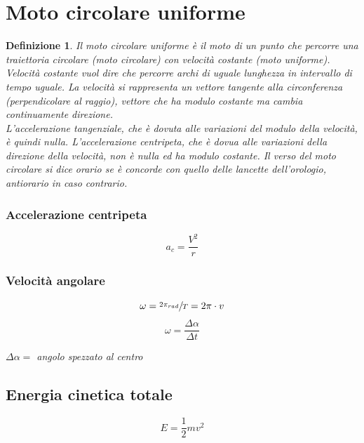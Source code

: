 \documentclass{book}
\newtheorem{defi}{Definizione}[section]
\begin{document}
\section{Moto circolare uniforme}
\label{sec:motCircUni}
\begin{defi}
  Il moto circolare uniforme è il moto di un punto che percorre una traiettoria circolare (moto circolare) con velocità costante (moto uniforme). Velocità costante vuol dire che percorre archi di uguale lunghezza in intervallo di tempo uguale. La velocità si rappresenta un vettore tangente alla circonferenza (perpendicolare al raggio), vettore che ha modulo costante ma cambia continuamente direzione. \\
  L'accelerazione tangenziale, che è dovuta alle variazioni del modulo della velocità, è quindi nulla. L'accelerazione centripeta, che è dovua alle variazioni della direzione della velocità, non è nulla ed ha modulo costante. Il verso del moto circolare si dice orario se è concorde con quello delle lancette dell'orologio, antiorario in caso contrario.
  \begin{multicols}{2}
    \subsubsection{Accelerazione centripeta}
    \label{sec:acccent}
    \begin{equation}
      \label{eq:acccentripeta}
      a_c=\frac{V^2}{r}
    \end{equation}
    \subsubsection{Velocità angolare}
    \label{sec:velang}
    \begin{equation}
      \label{eq:velang}
      \omega=\sfrac{2\pi_{rad}}{T}=2\pi\cdot v
    \end{equation}
    \begin{equation}
      \label{eq:Velang}
      \omega = \frac{\Delta \alpha}{\Delta t}
    \end{equation}
  \end{multicols}
  $\Delta\alpha =$ angolo spezzato al centro
\end{defi}

\subsection{Energia cinetica totale}
\label{sec:encintot}

\begin{equation}
  \label{eq:encintot}
  E=\frac{1}{2} mv^2
\end{equation}
\end{document}
